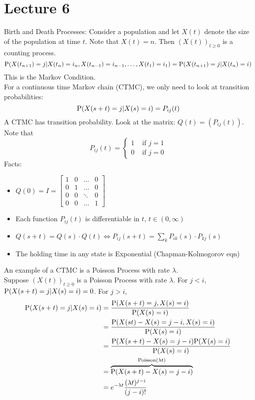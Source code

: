 \documentclass[12pt]{article}
\begin{document}
 \section{Lecture 6} 
 Birth and Death Processes: Consider a population and let $X(t)$ denote the size of the population at time $t$. Note that $X(t) = n$. Then $(X(t))_{t\geq 0}$ is a counting process. 
 $$ \mathrm{P}( X(t_{n+1}) = j | X(t_n) = i_n, X(t_{n-1}) = i_{n-1},\dots, X(t_1) = i_1 ) = \mathrm{P}( X(t_{n+1}) = j | X(t_n) = i ) $$ 
 This is the Markov Condition. \\
 For a continuous time Markov chain (CTMC), we only need to look at transition probabilities: $$ \mathrm{P}( X(s+t) = j | X(s) = i ) = P_{ij}(t) $$ 
 A CTMC has transition probability. Look at the matrix: $Q(t) = (P_{ij}(t))$. \\
 Note that $$P_{ij}(t) = \begin{cases} 1 &\text{ if } j = 1 \\ 0 &\text{ if } j = 0 \end{cases} $$ 
 Facts: \begin{itemize} 
 \item $Q(0) = I = \begin{bmatrix} 1 & 0 & \dots & 0 \\ 0 & 1 & \dots & 0 \\ 0 & 0 & \ddots & 0 
  \\ 0 & 0 & \dots & 1 \end{bmatrix}$ 
 \item Each function $P_{ij}(t)$ is differentiable in $t$, $t \in (0,\infty)$
 \item $Q(s+t) = Q(s)\cdot Q(t) \iff P_{ij}(s+t) = \sum_k P_{ik}(s)\cdot P_{kj}(s)$ 
 \item The holding time in any state is Exponential (Chapman-Kolmogorov eqn) \end{itemize} 
 An example of a CTMC is a Poisson Process with rate $\lambda$. \\
 Suppose $(X(t))_{t \geq 0}$ is a Poisson Process with rate $\lambda$. For $j < i$, $\mathrm{P}( X(s+t) = j | X(s) = i ) = 0$. For $j > i$, $$ \begin{aligned} 
 \mathrm{P}( X(s+t) = j | X(s) = i ) &= \frac{\mathrm{P}( X(s+t) = j, X(s) = i )}{\mathrm{P}( X(s) = i )} \\
 &= \frac{\mathrm{P}( X(s t) - X(s) = j - i, X(s) = i )}{\mathrm{P}( X(s) = i )} \\ 
 &= \frac{\mathrm{P}( X(s+t) - X(s) = j - i )\mathrm{P}( X(s) = i )}{\mathrm{P}( X(s) = i )} \\
 &= \overbrace{\mathrm{P}( X(s+t) - X(s) = j - i )}^{\text{Poisson}(\lambda t)} \\ 
 &= e^{-\lambda t} \frac{(\lambda t)^{j-i}}{(j-i)!}  \end{aligned} $$ 
\end{document}
